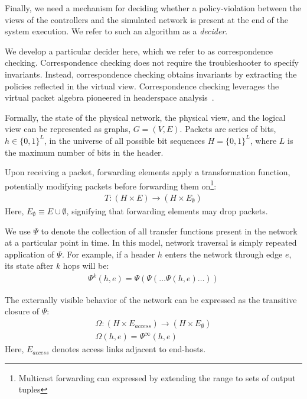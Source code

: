 Finally, we need a mechanism for deciding
whether a policy-violation between the views of the controllers and the simulated network
is present at the end of the system execution.
We refer to such an algorithm as a {\em decider}.

We develop a particular decider here, which we refer to as correspondence checking.
Correspondence checking does not require
the troubleshooter to specify invariants. Instead, correspondence checking
obtains invariants by extracting the policies reflected in the virtual view.
Correspondence checking leverages the virtual packet algebra
pioneered in headerspace analysis~\cite{hsa}.


Formally, the state of the physical network, the physical view, and the
logical view can be represented as graphs,
$G = (V, E)$. Packets are series of bits, $h \in \{0,1\}^L$, in the universe
of all possible bit sequences $H = \{0,1\}^L$,
where $L$ is the maximum number of bits in the header.

Upon receiving a packet,
forwarding elements apply a transformation function, potentially modifying
packets before forwarding them on\footnote{Multicast forwarding can expressed
by extending the range to sets of output tuples}:
\begin{align*}
T: (H \times E) \rightarrow (H \times E_{\emptyset})
\end{align*}
Here, $E_{\emptyset} \equiv E \cup \emptyset$, signifying that forwarding elements
may drop packets.

We use $\Psi$ to denote the collection of all transfer functions present in
the network at a particular point in time. In this model, network traversal is
simply repeated application of $\Psi$.
For example, if a header $h$ enters the network through edge
$e$, its state after $k$ hops will be:
\begin{align*}
\Psi^k(h,e) = \Psi(\Psi(\dots \Psi(h,e)\dots))
\end{align*}

The externally visible behavior of the network can be expressed as the
transitive closure of $\Psi$:
\begin{align*}
\Omega: (H \times E_{access}) \rightarrow (H \times E_{\emptyset}) \\
\Omega(h,e) = \Psi^{\infty}(h,e)
\end{align*}
Here, $E_{access}$ denotes access links adjacent to end-hosts.

